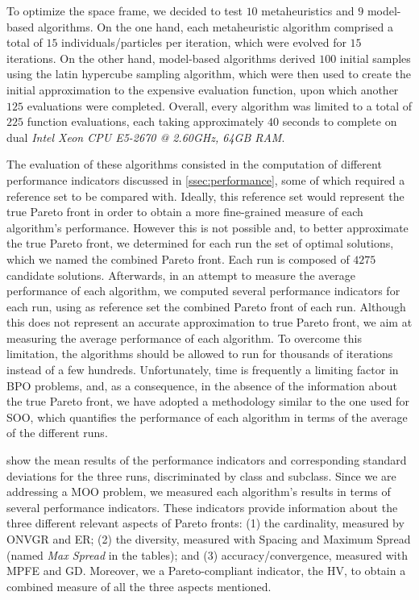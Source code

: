 To optimize the space frame, we decided to test $10$ metaheuristics and $9$ model-based algorithms. On the one hand, each metaheuristic algorithm comprised a total of $15$ individuals/particles per iteration, which were evolved for $15$ iterations. On the other hand, model-based algorithms derived $100$ initial samples using the latin hypercube sampling algorithm, which were then used to create the initial approximation to the expensive evaluation function, upon which another $125$ evaluations were completed. Overall, every algorithm was limited to a total of $225$ function evaluations, each taking approximately $40$ seconds to complete on dual \textit{Intel Xeon CPU E5-2670 @ 2.60GHz, 64GB RAM}. 

The evaluation of these algorithms consisted in the computation of different performance indicators discussed in \cref{ssec:performance}, some of which required a reference set to be compared with. Ideally, this reference set would represent the true Pareto front in order to obtain a more fine-grained measure of each algorithm's performance. However this is not possible and, to better approximate the true Pareto front, we determined for each run the set of optimal solutions, which we named the combined Pareto front. Each run is composed of $4275$ candidate solutions. Afterwards, in an attempt to measure the average performance of each algorithm, we computed several performance indicators for each run, using as reference set the combined Pareto front of each run. Although this does not represent an accurate approximation to true Pareto front, we aim at measuring the average performance of each algorithm. To overcome this limitation, the algorithms should be allowed to run for thousands of iterations instead of a few hundreds. Unfortunately, time is frequently a limiting factor in \ac{BPO} problems, and, as a consequence, in the absence of the information about the true Pareto front, we have adopted a methodology similar to the one used for \ac{SOO}, which quantifies the performance of each algorithm in terms of the average of the different runs. 

 show the mean results of the performance indicators and corresponding standard deviations for the three runs, discriminated by class and subclass. Since we are addressing a \ac{MOO} problem, we measured each algorithm's results in terms of several performance indicators. These indicators provide information about the three different relevant aspects of Pareto fronts: (1) the cardinality, measured by \ac{ONVGR} and \ac{ER}; (2) the diversity, measured with Spacing and Maximum Spread (named \textit{Max Spread} in the tables); and (3) accuracy/convergence, measured with \ac{MPFE} and \ac{GD}. Moreover, we a Pareto-compliant indicator, the \ac{HV}, to obtain a combined measure of all the three aspects mentioned. %


